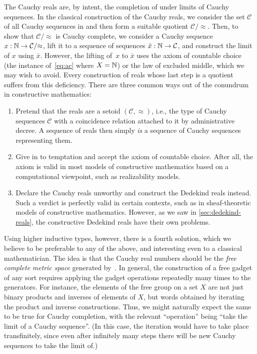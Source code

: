 %
%
%
The Cauchy reals are, by intent, the completion of \Q under limits of Cauchy sequences.
In the classical construction of the Cauchy reals, we consider the set $\mathcal{C}$ of all Cauchy sequences in \Q and then form a suitable quotient $\mathcal{C}/{\approx}$.
Then, to show that $\mathcal{C}/{\approx}$ is Cauchy complete, we consider a Cauchy sequence $x : \mathbb{N} \to \mathcal{C}/{\approx}$, lift it to a sequence of sequences $\bar{x} : \mathbb{N} \to \mathcal{C}$, and construct the limit of $x$ using $\bar{x}$. However, the lifting of~$x$ to $\bar{x}$ uses
the axiom of countable choice (the instance of~\eqref{eq:ac} where $X=\mathbb{N}$) or the law of excluded middle, which we may wish to avoid.
%
Every construction of reals whose last step is a quotient suffers from this deficiency.
There are three common ways out of the conundrum in constructive mathematics:
%
%
%
\begin{enumerate}
\item Pretend that the reals are a setoid $(\mathcal{C}, {\approx})$, i.e., the type of
  Cauchy sequences $\mathcal{C}$ with a coincidence relation attached to it by
  administrative decree. A sequence of reals then simply \emph{is} a sequence of Cauchy
  sequences representing them.
\item Give in to temptation and accept the axiom of countable choice. After all, the axiom
  is valid in most models of constructive mathematics based on a computational viewpoint,
  such as realizability models.
\item Declare the Cauchy reals unworthy and construct the Dedekind reals instead.
  Such a verdict is perfectly valid in certain contexts, such as in sheaf-theoretic models of constructive mathematics.
  However, as we saw in \cref{sec:dedekind-reals}, the constructive Dedekind reals have their own problems.
\end{enumerate}

Using higher inductive types, however, there is a fourth solution, which we believe to be preferable to any of the above, and interesting even to a classical mathematician.
The idea is that the Cauchy real numbers should be the \emph{free complete metric space} generated by~\Q.
In general, the construction of a free gadget of any sort requires applying the gadget operations repeatedly many times to the generators.
For instance, the elements of the free group on a set $X$ are not just binary products and inverses of elements of $X$, but words obtained by iterating the product and inverse constructions.
Thus, we might naturally expect the same to be true for Cauchy completion, with the relevant ``operation'' being ``take the limit of a Cauchy sequence''.
(In this case, the iteration would have to take place transfinitely, since even after infinitely many steps there will be new Cauchy sequences to take the limit of.)

